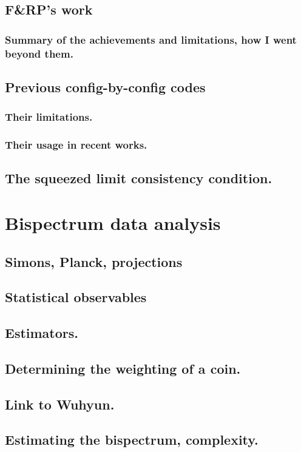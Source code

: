     \subsection{F&RP's work}
    \subsubsection{Summary of the achievements and limitations, how I went beyond them.}
    \subsection{Previous config-by-config codes}
    \subsubsection{Their limitations.}
    \subsubsection{Their usage in recent works.}
    \subsection{The squeezed limit consistency condition.}
\section{Bispectrum data analysis}
    \subsection{Simons, Planck, projections}
    \subsection{Statistical observables}
    \subsection{Estimators.}
    \subsection{Determining the weighting of a coin.}
    \subsection{Link to Wuhyun.}
    \subsection{Estimating the bispectrum, complexity.}
